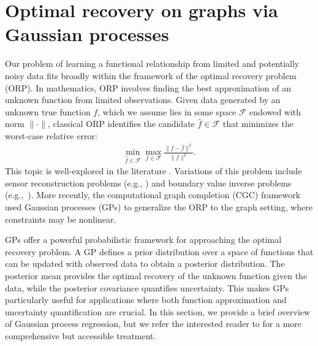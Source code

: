 \documentclass{article}
\theoremstyle{definition}
\theoremstyle{remark}
\begin{document}
\section{Optimal recovery on graphs via Gaussian processes}\label{sec:optimal_recovery}

Our problem of learning a functional relationship from limited and potentially noisy data fits broadly within the framework of the optimal recovery problem (ORP). In mathematics, ORP involves finding the best approximation of an unknown function from limited observations. Given data generated by an unknown true function $f$, which we assume lies in some space $\mathcal{F}$ endowed with norm $\|\cdot\|$, classical ORP identifies the candidate $\hat{f}\in\mathcal{F}$ that minimizes the worst-case relative error:
\begin{align}
\min_{\hat{f}\in\mathcal{F}}\max_{f\in\mathcal{F}} \frac{\|f-\hat{f}\|^2}{\|f\|^2}.
\end{align}
This topic is well-explored in the literature \cite{donoho_statistical_1994,micchelli_survey_1977, Micchelli1976, Owhadi_Scovel_2019}. Variations of this problem include sensor reconstruction problems (e.g., \cite{reconstruction}) and boundary value inverse problems (e.g.,~\cite{ibvp_2000}). More recently, the computational graph completion (CGC) framework \cite{owhadi2022computational} used Gaussian processes (GPs) to generalize the ORP to the graph setting, where constraints may be nonlinear.

GPs offer a powerful probabilistic framework for approaching the optimal recovery problem. A GP defines a prior distribution over a space of functions that can be updated with observed data to obtain a posterior distribution. The posterior mean provides the optimal recovery of the unknown function given the data, while the posterior covariance quantifies uncertainty. This makes GPs particularly useful for applications where both function approximation and uncertainty quantification are crucial. In this section, we provide a brief overview of Gaussian process regression, but we refer the interested reader to \cite{rasmussen_gaussian_2008} for a more comprehensive but accessible treatment.
\end{document}
